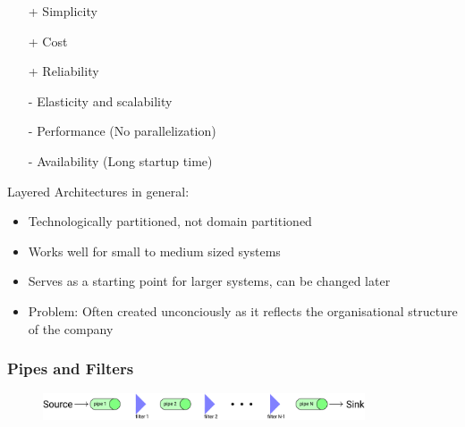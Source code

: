 \documentclass[
../../Software_Engineering_Summary.tex,
]
{subfiles}
\begin{document}
\begin{defbox}
    \begin{minipage}
        [t]{0.5\textwidth}
        \centering
        \begin{itemize}
            \item[+] Simplicity
            \item[+] Cost
            \item[+] Reliability  
        \end{itemize}
    \end{minipage}
    \hfill
    \begin{minipage}
        [t]{0.5\textwidth}
        \centering
        \begin{itemize}
            \item[-] Elasticity and scalability
            \item[-] Performance (No parallelization)
            \item[-] Availability (Long startup time)
        \end{itemize}
    \end{minipage}  
\end{defbox}

Layered Architectures in general:
\begin{itemize}
    \item Technologically partitioned, not domain partitioned
    \item Works well for small to medium sized systems
    \item Serves as a starting point for larger systems, can be changed later
    \item Problem: Often created unconciously as it reflects the organisational structure of the company
\end{itemize}

\subsubsection{Pipes and Filters}
\begin{figure}
    [htp]
    \centering
    \includegraphics[width = 0.85\textwidth]{Pics/PipesAndFilters.png}
\end{figure}
\end{document}

